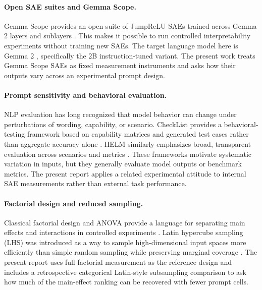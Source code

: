 \documentclass[11pt]{article}
\begin{document}
\paragraph{Open SAE suites and Gemma Scope.}
Gemma Scope provides an open suite of JumpReLU SAEs trained across Gemma 2 layers and sublayers \citep{lieberum2024gemmascope}. This makes it possible to run controlled interpretability experiments without training new SAEs. The target language model here is Gemma 2 \citep{gemmateam2024gemma2}, specifically the 2B instruction-tuned variant. The present work treats Gemma Scope SAEs as fixed measurement instruments and asks how their outputs vary across an experimental prompt design.

\paragraph{Prompt sensitivity and behavioral evaluation.}
NLP evaluation has long recognized that model behavior can change under perturbations of wording, capability, or scenario. CheckList provides a behavioral-testing framework based on capability matrices and generated test cases rather than aggregate accuracy alone \citep{ribeiro2020checklist}. HELM similarly emphasizes broad, transparent evaluation across scenarios and metrics \citep{liang2022helm}. These frameworks motivate systematic variation in inputs, but they generally evaluate model outputs or benchmark metrics. The present report applies a related experimental attitude to internal SAE measurements rather than external task performance.

\paragraph{Factorial design and reduced sampling.}
Classical factorial design and ANOVA provide a language for separating main effects and interactions in controlled experiments \citep{fisher1935design,montgomery2017design}. Latin hypercube sampling (LHS) was introduced as a way to sample high-dimensional input spaces more efficiently than simple random sampling while preserving marginal coverage \citep{mckay1979lhs}. The present report uses full factorial measurement as the reference design and includes a retrospective categorical Latin-style subsampling comparison to ask how much of the main-effect ranking can be recovered with fewer prompt cells.
\end{document}

